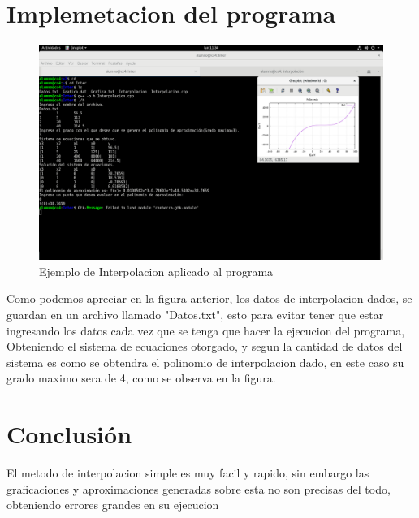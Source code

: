 \documentclass{article}
\begin{document}
\begin{multicols}{2}
\section{Implemetacion del programa}
\label{sec:res}
\begin{figure}[H]
\centering
\includegraphics[scale=.125]{Interpolacion2.png}
\caption{Ejemplo de Interpolacion aplicado al programa}
\end{figure}
Como podemos apreciar en la figura anterior, los datos de interpolacion dados, se guardan en un archivo llamado "Datos.txt", esto para evitar tener que estar ingresando los datos cada vez que se tenga que hacer la ejecucion del programa, Obteniendo el sistema de ecuaciones otorgado, y segun la cantidad de datos del sistema es como se obtendra el polinomio de interpolacion dado, en este caso su grado maximo sera de 4, como se observa en la figura.
\section{Conclusión}
\label{sec:concl}
El metodo de interpolacion simple es muy facil y rapido, sin embargo las graficaciones y aproximaciones generadas sobre esta no son precisas del todo, obteniendo errores grandes en su ejecucion

\end{multicols}
\end{document}
